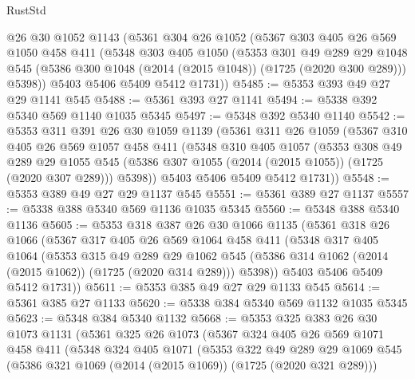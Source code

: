 \begin{lexlean}{RustStd}
\begin{coremodule}
{\begin{coremodule}
{{{{{{{{{{{{{    @26
    @30
    @1052
    @1143
    (@5361
      @304
      @26
      @1052
      (@5367
        @303
        @405
        @26
        @569
        @1050
        @458
        @411
        (@5348
          @303
          @405
          @1050
          (@5353
            @301
            @49
            @289
            @29
            @1048
            @545
            (@5386 @300 @1048 (@2014 (@2015 @1048)) (@1725 (@2020 @300 @289)))
            @5398))
        @5403
        @5406
        @5409
        @5412
        @1731))
@5485 := @5353 @393 @49 @27 @29 @1141 @545
@5488 := @5361 @393 @27 @1141
@5494 := @5338 @392 @5340 @569 @1140 @1035 @5345
@5497 := @5348 @392 @5340 @1140
@5542 := @5353
    @311
    @391
    @26
    @30
    @1059
    @1139
    (@5361
      @311
      @26
      @1059
      (@5367
        @310
        @405
        @26
        @569
        @1057
        @458
        @411
        (@5348
          @310
          @405
          @1057
          (@5353
            @308
            @49
            @289
            @29
            @1055
            @545
            (@5386 @307 @1055 (@2014 (@2015 @1055)) (@1725 (@2020 @307 @289)))
            @5398))
        @5403
        @5406
        @5409
        @5412
        @1731))
@5548 := @5353 @389 @49 @27 @29 @1137 @545
@5551 := @5361 @389 @27 @1137
@5557 := @5338 @388 @5340 @569 @1136 @1035 @5345
@5560 := @5348 @388 @5340 @1136
@5605 := @5353
    @318
    @387
    @26
    @30
    @1066
    @1135
    (@5361
      @318
      @26
      @1066
      (@5367
        @317
        @405
        @26
        @569
        @1064
        @458
        @411
        (@5348
          @317
          @405
          @1064
          (@5353
            @315
            @49
            @289
            @29
            @1062
            @545
            (@5386 @314 @1062 (@2014 (@2015 @1062)) (@1725 (@2020 @314 @289)))
            @5398))
        @5403
        @5406
        @5409
        @5412
        @1731))
@5611 := @5353 @385 @49 @27 @29 @1133 @545
@5614 := @5361 @385 @27 @1133
@5620 := @5338 @384 @5340 @569 @1132 @1035 @5345
@5623 := @5348 @384 @5340 @1132
@5668 := @5353
    @325
    @383
    @26
    @30
    @1073
    @1131
    (@5361
      @325
      @26
      @1073
      (@5367
        @324
        @405
        @26
        @569
        @1071
        @458
        @411
        (@5348
          @324
          @405
          @1071
          (@5353
            @322
            @49
            @289
            @29
            @1069
            @545
            (@5386 @321 @1069 (@2014 (@2015 @1069)) (@1725 (@2020 @321 @289)))
}}}}}}}}}}}}}
\end{coremodule}}
\end{coremodule}
\end{lexlean}
